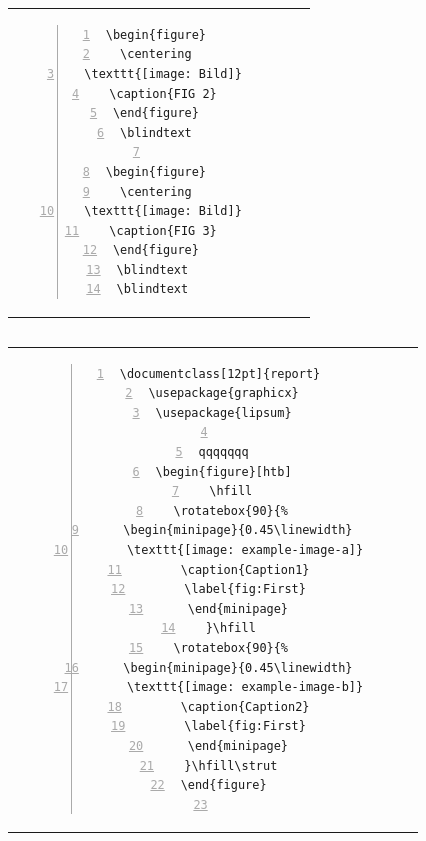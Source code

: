 \begin{tabular}{c | c}
\begin{minipage}[m]{0.55\textwidth}
\begin{lstlisting}[numberstyle=\zebra{red!15}{green!15},numbers=left,basicstyle=\ttfamily\scriptsize]
\begin{figure}
  \centering  
  \texttt{[image: Bild]}
  \caption{FIG 2}
\end{figure}
\blindtext

\begin{figure}
  \centering  
  \texttt{[image: Bild]}
  \caption{FIG 3}
\end{figure}
\blindtext 
\blindtext 

\end{lstlisting}
\end{minipage}
\end{tabular}
 
 

 \subsection{}
\begin{tabular}{c | c}
\begin{minipage}[m]{0.4\textwidth}
 
\rotatebox{90}{%
\begin{minipage}{0.88\linewidth}
\texttt{[image: example-image-a]}
\end{minipage}}
 
\end{minipage}
&
\begin{minipage}[m]{0.55\textwidth}
\renewcommand\textminus{\mbox{-}}%
\begin{lstlisting}[numberstyle=\zebra{red!15}{green!15},numbers=left,basicstyle=\ttfamily\scriptsize]
\documentclass[12pt]{report} 
\usepackage{graphicx}
\usepackage{lipsum}

qqqqqqq
\begin{figure}[htb]
  \hfill
  \rotatebox{90}{%
    \begin{minipage}{0.45\linewidth}
      \texttt{[image: example-image-a]}
      \caption{Caption1}
      \label{fig:First}
    \end{minipage}
  }\hfill
  \rotatebox{90}{%
    \begin{minipage}{0.45\linewidth}
      \texttt{[image: example-image-b]}
      \caption{Caption2}
      \label{fig:First}
    \end{minipage}
  }\hfill\strut
\end{figure}


\end{lstlisting}
\end{minipage}
\end{tabular}


